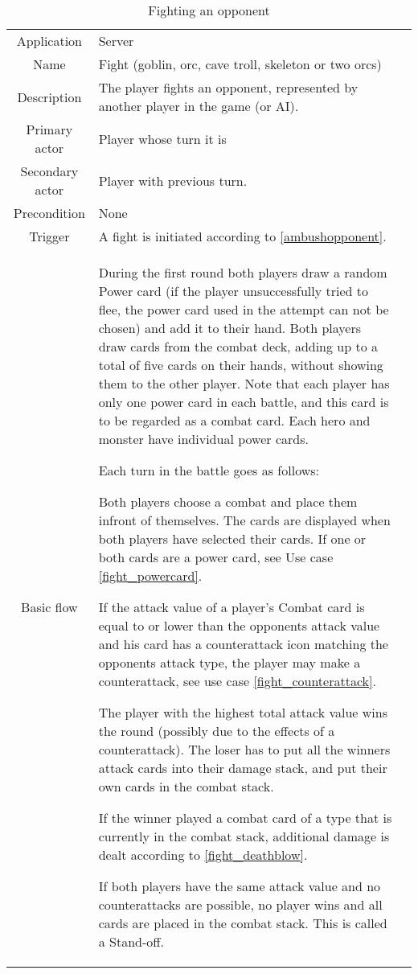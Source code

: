 \documentclass[a4paper,10pt]{report}
\begin{document}
\begin{table}
\caption{Fighting an opponent}
\label{fightopponent}
\begin{tabular}{|c| p{9cm}|c}
\hline
Application & Server & \\
Name & Fight (goblin, orc, cave troll, skeleton or two orcs) & \\
Description & The player fights an opponent, represented by another player in the game (or AI). & \\
Primary actor & Player whose turn it is & \\
Secondary actor & Player with previous turn. & \\
Precondition & None & \\
Trigger & A fight is initiated according to \ref{ambushopponent}. & \\ \hline
Basic flow & During the first round both players draw a random Power card (if the player unsuccessfully tried to flee, the power card used in the attempt can not be chosen) and add it to their hand. Both players draw cards from the combat deck, adding up to a total of five cards on their hands, without showing them to the other player. Note that each player has only one power card in each battle, and this card is to be regarded as a combat card. Each hero and monster have individual power cards.

Each turn in the battle goes as follows:

Both players choose a combat and place them infront of themselves. The cards are displayed when both players have selected their cards. If one or both cards are a power card, see Use case \ref{fight_powercard}.

If the attack value of a player's Combat card is equal to or lower than the opponents attack value and his card has a counterattack icon matching the opponents attack type, the player may make a counterattack, see use case \ref{fight_counterattack}.

The player with the highest total attack value wins the round (possibly due to the effects of a counterattack). The loser has to put all the winners attack cards into their damage stack, and put their own cards in the combat stack.

If the winner played a combat card of a type that is currently in the combat stack, additional damage is dealt according to \ref{fight_deathblow}.

If both players have the same attack value and no counterattacks are possible, no player wins and all cards are placed in the combat stack. This is called a Stand-off.


\end{tabular}
\end{table}
\end{document}
